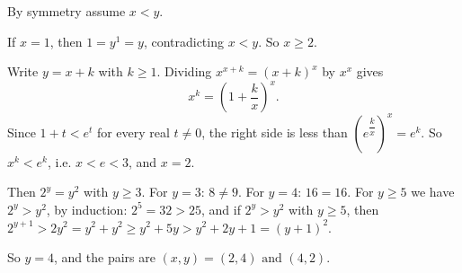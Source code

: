 By symmetry assume $x<y$.

If $x=1$, then $1=y^1=y$, contradicting $x<y$. So $x\ge2$.

Write $y=x+k$ with $k\ge1$. Dividing $x^{x+k}=(x+k)^x$ by $x^x$ gives
\[x^k=\left(1+\dfrac kx\right)^x.\]
Since $1+t<e^t$ for every real $t\ne0$, the right side is less than $\left(e^{\dfrac kx}\right)^x=e^k$. So $x^k<e^k$, i.e. $x<e<3$, and $x=2$.

Then $2^y=y^2$ with $y\ge3$. For $y=3$: $8\ne9$. For $y=4$: $16=16$. For $y\ge5$ we have $2^y>y^2$, by induction: $2^5=32>25$, and if $2^y>y^2$ with $y\ge5$, then $2^{y+1}>2y^2=y^2+y^2\ge y^2+5y>y^2+2y+1=(y+1)^2$.

So $y=4$, and the pairs are $\boxed{(x,y)=(2,4)\text{ and }(4,2)}$.
